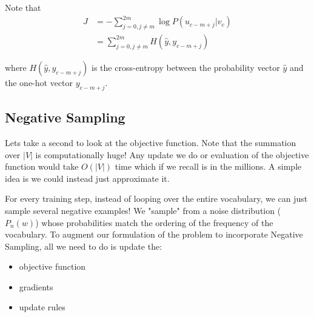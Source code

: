 \documentclass[nobib]{tufte-handout}
\begin{document}

Note that 
\begin{align*}
J &= -\sum_{j=0, j\neq m}^{2m} \log P(u_{c-m+j}|v_{c})\\
&= \sum_{j=0, j\neq m}^{2m} H(\hat{y}, y_{c-m+j})
\end{align*}

where $ H(\hat{y}, y_{c-m+j}) $ is the cross-entropy between the probability vector $ \hat{y} $ and the one-hot vector $ y_{c-m+j} $.


\subsection{Negative Sampling}

Lets take a second to look at the objective function. Note that the summation over $|V|$ is computationally huge! Any update we do or evaluation of the objective function would take $O(|V|)$ time which if we recall is in the millions. A simple idea is we could instead just approximate it.

For every training step, instead of looping over the entire vocabulary, we can just sample several negative examples! We "sample" from a noise distribution ($P_n(w)$) whose probabilities match the ordering of the frequency of the vocabulary. To augment our formulation of the problem to incorporate Negative Sampling, all we need to do is update the:
\begin{itemize}
\item objective function
\item gradients
\item update rules
\end{itemize}
\end{document}

